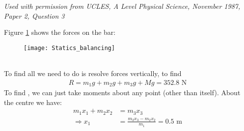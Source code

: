 
\begin{problem} %
{

\nl {}}
{\textit{Used with permission from UCLES, A Level Physical Science, November 1987, Paper 2, Question 3}}
{
Figure \ref{fig:Statics_balancing} shows the forces on the bar:
\begin{figure}[h]
\centering
\texttt{[image: Statics\_balancing]}
\caption{}
\label{fig:Statics_balancing}
\end{figure}
\\
To find  all we need to do is resolve forces vertically, to find
\begin{align*}
R=m_1g+m_2g+m_3g+Mg=352.8\textrm{ N}
\end{align*}
To find , we can just take moments about any point (other than  itself). About the centre we have:
\begin{align*}
m_1x_1+m_2x_2&=m_3x_3 \\
\Rightarrow x_1&=\frac{m_3x_3-m_2x_2}{m_1}=0.5\textrm{ m}
\end{align*}
}
\end{problem}